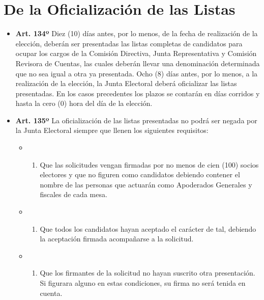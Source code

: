 \documentclass[openany]{book}
\providecommand{\tightlist}{%
  \setlength{\itemsep}{0pt}\setlength{\parskip}{0pt}}
\begin{document}
\hypertarget{de-la-oficializacion-de-las-listas}{%
\section{De la Oficialización de las Listas}\label{de-la-oficializacion-de-las-listas}}

\begin{itemize}
\tightlist
\item
  \textbf{Art. 134º}
  Diez (10) días antes, por lo menos, de la fecha de realización de la elección, deberán ser presentadas las listas completas de candidatos para ocupar los cargos de la Comisión Directiva, Junta Representativa y Comisión Revisora de Cuentas, las cuales deberán llevar una denominación determinada que no sea igual a otra ya presentada. Ocho (8) días antes, por lo menos, a la realización de la elección, la Junta Electoral deberá oficializar las listas presentadas. En los casos precedentes los plazos se contarán en días corridos y hasta la cero (0) hora del día de la elección.
\end{itemize}

\begin{itemize}
\tightlist
\item
  \textbf{Art. 135º}
  La oficialización de las listas presentadas no podrá ser negada por la Junta Electoral siempre que llenen los siguientes requisitos:

  \begin{itemize}
  \item
    \begin{enumerate}
    \def\labelenumi{\alph{enumi})}
    \tightlist
    \item
      Que las solicitudes vengan firmadas por no menos de cien (100) socios electores y que no figuren como candidatos debiendo contener el nombre de las personas que actuarán como Apoderados Generales y fiscales de cada mesa.
    \end{enumerate}
  \item
    \begin{enumerate}
    \def\labelenumi{\alph{enumi})}
    \setcounter{enumi}{1}
    \tightlist
    \item
      Que todos los candidatos hayan aceptado el carácter de tal, debiendo la aceptación firmada acompañarse a la solicitud.
    \end{enumerate}
  \item
    \begin{enumerate}
    \def\labelenumi{\alph{enumi})}
    \setcounter{enumi}{2}
    \tightlist
    \item
      Que los firmantes de la solicitud no hayan suscrito otra presentación. Si figurara alguno en estas condiciones, su firma no será tenida en cuenta.
    \end{enumerate}
  \end{itemize}
\end{itemize}
\end{document}
